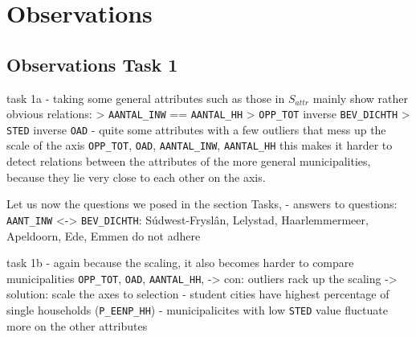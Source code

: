 \section{Observations}

\subsection{Observations Task 1}

task 1a
- taking some general attributes such as those in $S_{attr}$ mainly show rather obvious relations:
    > \texttt{AANTAL\_INW} == \texttt{AANTAL\_HH}
    > \texttt{OPP\_TOT} inverse \texttt{BEV\_DICHTH}
    > \texttt{STED} inverse \texttt{OAD}
- quite some attributes with a few outliers that mess up the scale of the axis
\texttt{OPP\_TOT}, \texttt{OAD}, \texttt{AANTAL\_INW}, \texttt{AANTAL\_HH}
    this makes it harder to detect relations between the attributes of the more general municipalities, because they lie very close to each other on the axis.

Let us now the questions we posed in the section Tasks,
- answers to questions: \texttt{AANT\_INW} <-> \texttt{BEV\_DICHTH}: Súdwest-Fryslân, Lelystad, Haarlemmermeer, Apeldoorn, Ede, Emmen do not adhere


task 1b
- again because the scaling, it also becomes harder to compare municipalities
\texttt{OPP\_TOT}, \texttt{OAD}, \texttt{AANTAL\_HH},
-> con: outliers rack up the scaling -> solution: scale the axes to selection
- student cities have highest percentage of single households (\texttt{P\_EENP\_HH})
- municipalicites with low \texttt{STED} value fluctuate more on the other attributes

